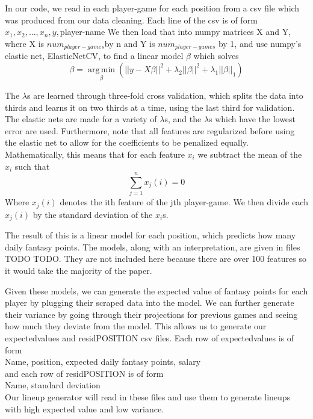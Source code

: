 \documentclass[12pt]{article}
\DeclareMathOperator*{\argmin}{arg\,min}
\renewcommand{\=}[1]{\stackrel{#1}{=}} %
\theoremstyle{definition}
\begin{document}
In our code, we read in each player-game for each position from a csv file which was produced from our data cleaning.  Each line of the csv is of form\\
$x_1, x_2, ..., x_n, y, $player-name
We then load that into numpy matrices X and Y, where X is $num_{player-games} $by n and Y is $num_{player-games}$ by 1, and use numpy's elastic net, ElasticNetCV, to find a linear model $\beta$ which solves 
$$\beta  = \argmin\limits_\beta (||y - X \beta ||^2 + \lambda_2||\beta||^2 + \lambda_1||\beta||_1)$$

The $\lambda$s are learned through three-fold cross validation, which splits the data into thirds and learns it on two thirds at a time, using the last third for validation.  The elastic nets are made for a variety of $\lambda$s, and the $\lambda$s which have the lowest error are used.  Furthermore, note that all features are regularized before using the elastic net to allow for the coefficients to be penalized equally.  Mathematically, this means that for each feature $x_i$ we subtract the mean of the $x_i$ such that $$\sum\limits_{j=1}^n x_j(i) = 0$$ Where $x_j(i)$ denotes the ith feature of the jth player-game.  We then divide each $x_j(i)$ by the standard deviation of the $x_i$s.  

The result of this is a linear model for each position, which predicts how many daily fantasy points.  The models, along with an interpretation, are given in files TODO TODO.  They are not included here because there are over 100 features so it would take the majority of the paper.  

Given these models, we can generate the expected value of fantasy points for each player by plugging their scraped data into the model.  We can further generate their variance by going through their projections for previous games and seeing how much they deviate from the model.  This allows us to generate our expectedvalues and residPOSITION csv files.  Each row of expectedvalues is of form \\

Name, position, expected daily fantasy points, salary\\

and each row of residPOSITION is of form \\

Name, standard deviation \\

Our lineup generator will read in these files and use them to generate lineups with high expected value and low variance.
\end{document}
